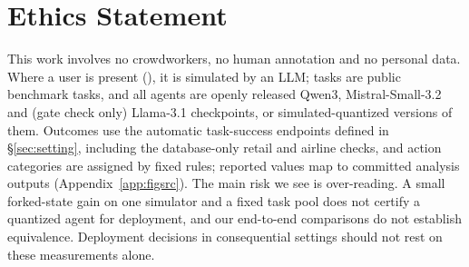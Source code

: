 \section*{Ethics Statement}

This work involves no crowdworkers, no human annotation and no personal data. Where a user is present (\tautwo{}), it is simulated by an LLM; tasks are public benchmark tasks, and all agents are openly released Qwen3, Mistral-Small-3.2 and (gate check only) Llama-3.1 checkpoints, or simulated-quantized versions of them. Outcomes use the automatic task-success endpoints defined in \S\ref{sec:setting}, including the database-only retail and airline checks, and action categories are assigned by fixed rules; reported values map to committed analysis outputs (Appendix~\ref{app:figsrc}). %
The main risk we see is over-reading. A small forked-state gain on one simulator and a fixed task pool does not certify a quantized agent for deployment, and our end-to-end comparisons do not establish equivalence. Deployment decisions in consequential settings should not rest on these measurements alone.


